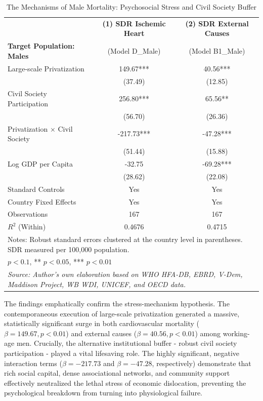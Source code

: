 \documentclass[en,magisterska]{pracamgr}
\begin{document}
\begin{table}[H]
\centering
\caption{The Mechanisms of Male Mortality: Psychosocial Stress and Civil Society Buffer}
\label{tab:mechanisms}
\footnotesize
\begin{tabular}{l c c}
\toprule
 & \textbf{(1) SDR Ischemic Heart} & \textbf{(2) SDR External Causes} \\
\textbf{Target Population: Males} & (Model D\_Male) & (Model B1\_Male) \\
\midrule
Large-scale Privatization & 149.67*** & 40.56*** \\
 & (37.49) & (12.85) \\
Civil Society Participation & 256.80*** & 65.56** \\
 & (56.70) & (26.36) \\
Privatization $\times$ Civil Society & -217.73*** & -47.28*** \\
 & (51.44) & (15.88) \\
Log GDP per Capita & -32.75 & -69.28*** \\
 & (28.62) & (22.08) \\
\midrule
Standard Controls & Yes & Yes \\
Country Fixed Effects & Yes & Yes \\
Observations & 167 & 167 \\
$R^2$ (Within) & 0.4676 & 0.4715 \\
\bottomrule
\multicolumn{3}{l}{\scriptsize Notes: Robust standard errors clustered at the country level in parentheses. SDR measured per 100,000 population.} \\
\multicolumn{3}{l}{\scriptsize * $p < 0.1$, ** $p < 0.05$, *** $p < 0.01$} \\
\multicolumn{3}{l}{\scriptsize \textit{Source: Author's own elaboration based on WHO HFA-DB, EBRD, V-Dem, Maddison Project, WB WDI, UNICEF, and OECD data.}} \\
\end{tabular}
\end{table}

The findings emphatically confirm the stress-mechanism hypothesis. The contemporaneous execution of large-scale privatization generated a massive, statistically significant surge in both cardiovascular 
mortality ($\beta = 149.67, p < 0.01$) and external causes ($\beta = 40.56, p < 0.01$) among working-age men. Crucially, the alternative institutional buffer  -  robust civil society participation  -  played a 
vital lifesaving role. The highly significant, negative interaction terms ($\beta = -217.73$ and $\beta = -47.28$, respectively) demonstrate that rich social capital, dense associational networks, and 
community support effectively neutralized the lethal stress of economic dislocation, preventing the psychological breakdown from turning into physiological failure.
\end{document}
